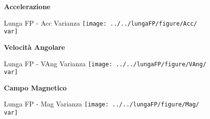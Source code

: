 \documentclass[a4paper, 9pt]{beamer}
\newcommand{\var}{Varianza}
\begin{document}
	\begin{frame}
		\color{blue}\centering\Huge{\textbf{Accelerazione}}	
	\end{frame}
	
	\begin{frame}{{Lunga FP - Acc \var}}
		\centering\texttt{[image: ../../lungaFP/figure/Acc/\\var]}
	\end{frame}
	
%	
	
	\begin{frame}
		\color{blue}\centering\Huge{\textbf{Velocità Angolare}}	
	\end{frame}
	
	\begin{frame}{{Lunga FP - VAng \var}}
		\centering\texttt{[image: ../../lungaFP/figure/VAng/\\var]}
	\end{frame}
	
%	

	\begin{frame}
		\color{blue}\centering\Huge{\textbf{Campo Magnetico}}	
	\end{frame}
	
	\begin{frame}{{Lunga FP - Mag \var}}
		\centering\texttt{[image: ../../lungaFP/figure/Mag/\\var]}
	\end{frame}
	
%	
	
\end{document}
